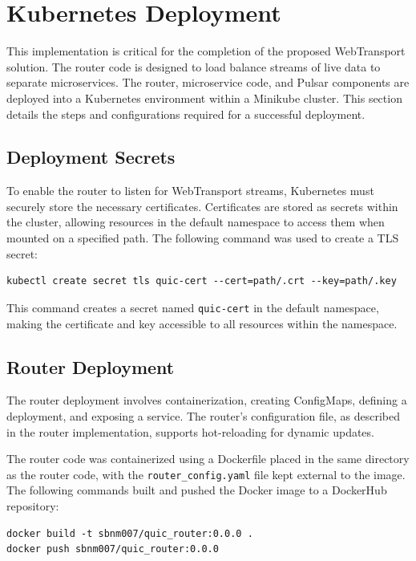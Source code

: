 \section{Kubernetes Deployment}
This implementation is critical for the completion of the proposed WebTransport solution. The router code is designed to load balance streams of live data to separate microservices. The router, microservice code, and Pulsar components are deployed into a Kubernetes environment within a Minikube cluster. This section details the steps and configurations required for a successful deployment.

\subsection{Deployment Secrets}
To enable the router to listen for WebTransport streams, Kubernetes must securely store the necessary certificates. Certificates are stored as secrets within the cluster, allowing resources in the default namespace to access them when mounted on a specified path. The following command was used to create a TLS secret:

\begin{lstlisting}[breaklines=true,basicstyle=\small\ttfamily,frame=single]
kubectl create secret tls quic-cert --cert=path/.crt --key=path/.key
\end{lstlisting}

This command creates a secret named \texttt{quic-cert} in the default namespace, making the certificate and key accessible to all resources within the namespace.

\subsection{Router Deployment}
The router deployment involves containerization, creating ConfigMaps, defining a deployment, and exposing a service. The router’s configuration file, as described in the router implementation, supports hot-reloading for dynamic updates.

The router code was containerized using a Dockerfile placed in the same directory as the router code, with the \texttt{router\_config.yaml} file kept external to the image. The following commands built and pushed the Docker image to a DockerHub repository:

\begin{lstlisting}[breaklines=true,basicstyle=\small\ttfamily,frame=single]
docker build -t sbnm007/quic_router:0.0.0 .
docker push sbnm007/quic_router:0.0.0
\end{lstlisting}

